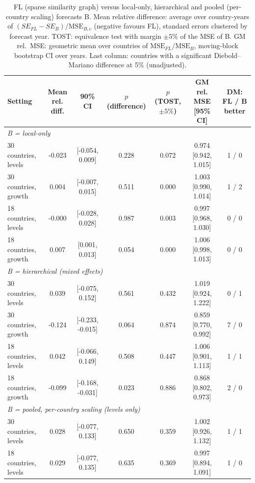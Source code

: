 \begin{table}[htbp]
\centering
\caption{FL (sparse similarity graph) versus local-only, hierarchical and pooled (per-country scaling) forecasts B. Mean relative difference: average over country-years of $(SE_{FL}-SE_{B})/\mathrm{MSE}_{B,c}$ (negative favours FL), standard errors clustered by forecast year. TOST: equivalence test with margin $\pm5\%$ of the MSE of B. GM rel.\ MSE: geometric mean over countries of $\mathrm{MSE}_{FL}/\mathrm{MSE}_{B}$, moving-block bootstrap CI over years. Last column: countries with a significant Diebold--Mariano difference at 5\% (unadjusted).}
\label{tab:fl_vs_local}
\begin{tabular}{lcccccc}
\toprule
Setting & Mean rel. diff. & 90\% CI & $p$ (difference) & $p$ (TOST, $\pm 5\%$) & GM rel. MSE [95\% CI] & DM: FL / B better \\
\midrule
\multicolumn{7}{l}{\emph{B = local-only}} \\
30 countries, levels & -0.023 & [-0.054, 0.009] & 0.228 & 0.072 & 0.974 [0.942, 1.015] & 1 / 0 \\
30 countries, growth & 0.004 & [-0.007, 0.015] & 0.511 & 0.000 & 1.003 [0.990, 1.014] & 1 / 2 \\
18 countries, levels & -0.000 & [-0.028, 0.028] & 0.987 & 0.003 & 0.997 [0.968, 1.030] & 0 / 0 \\
18 countries, growth & 0.007 & [0.001, 0.013] & 0.054 & 0.000 & 1.006 [0.998, 1.013] & 0 / 0 \\
\midrule
\multicolumn{7}{l}{\emph{B = hierarchical (mixed effects)}} \\
30 countries, levels & 0.039 & [-0.075, 0.152] & 0.561 & 0.432 & 1.019 [0.924, 1.222] & 0 / 1 \\
30 countries, growth & -0.124 & [-0.233, -0.015] & 0.064 & 0.874 & 0.859 [0.770, 0.992] & 7 / 0 \\
18 countries, levels & 0.042 & [-0.066, 0.149] & 0.508 & 0.447 & 1.006 [0.901, 1.113] & 1 / 1 \\
18 countries, growth & -0.099 & [-0.168, -0.031] & 0.023 & 0.886 & 0.868 [0.802, 0.973] & 2 / 0 \\
\midrule
\multicolumn{7}{l}{\emph{B = pooled, per-country scaling (levels only)}} \\
30 countries, levels & 0.028 & [-0.077, 0.133] & 0.650 & 0.359 & 1.002 [0.926, 1.132] & 1 / 1 \\
18 countries, levels & 0.029 & [-0.077, 0.135] & 0.635 & 0.369 & 0.997 [0.894, 1.091] & 1 / 0 \\
\bottomrule
\end{tabular}
\end{table}
